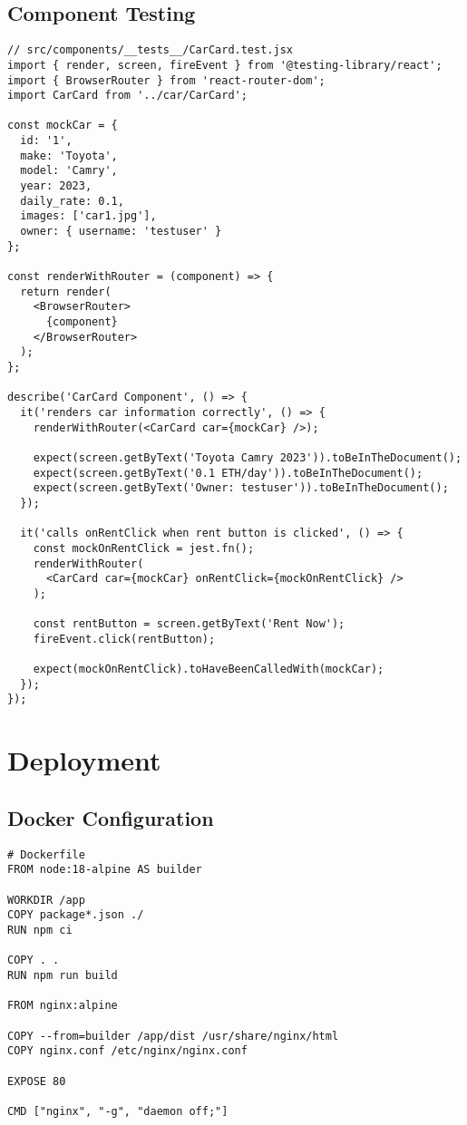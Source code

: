 \documentclass[12pt,a4paper]{article}
\begin{document}
\subsection{Component Testing}
\begin{lstlisting}[caption=Example Component Test]
// src/components/__tests__/CarCard.test.jsx
import { render, screen, fireEvent } from '@testing-library/react';
import { BrowserRouter } from 'react-router-dom';
import CarCard from '../car/CarCard';

const mockCar = {
  id: '1',
  make: 'Toyota',
  model: 'Camry',
  year: 2023,
  daily_rate: 0.1,
  images: ['car1.jpg'],
  owner: { username: 'testuser' }
};

const renderWithRouter = (component) => {
  return render(
    <BrowserRouter>
      {component}
    </BrowserRouter>
  );
};

describe('CarCard Component', () => {
  it('renders car information correctly', () => {
    renderWithRouter(<CarCard car={mockCar} />);
    
    expect(screen.getByText('Toyota Camry 2023')).toBeInTheDocument();
    expect(screen.getByText('0.1 ETH/day')).toBeInTheDocument();
    expect(screen.getByText('Owner: testuser')).toBeInTheDocument();
  });

  it('calls onRentClick when rent button is clicked', () => {
    const mockOnRentClick = jest.fn();
    renderWithRouter(
      <CarCard car={mockCar} onRentClick={mockOnRentClick} />
    );
    
    const rentButton = screen.getByText('Rent Now');
    fireEvent.click(rentButton);
    
    expect(mockOnRentClick).toHaveBeenCalledWith(mockCar);
  });
});
\end{lstlisting}

\section{Deployment}

\subsection{Docker Configuration}
\begin{lstlisting}[caption=Frontend Dockerfile]
# Dockerfile
FROM node:18-alpine AS builder

WORKDIR /app
COPY package*.json ./
RUN npm ci

COPY . .
RUN npm run build

FROM nginx:alpine

COPY --from=builder /app/dist /usr/share/nginx/html
COPY nginx.conf /etc/nginx/nginx.conf

EXPOSE 80

CMD ["nginx", "-g", "daemon off;"]
\end{lstlisting}
\end{document}
